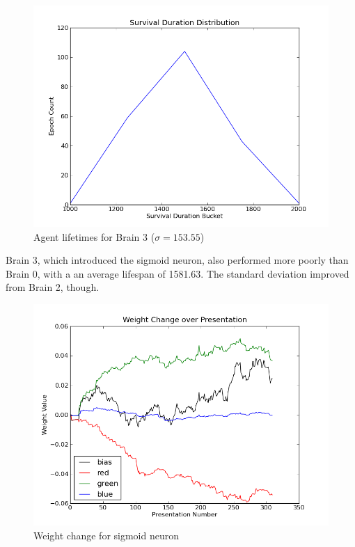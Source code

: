 \begin{figure}
\begin{center}
  \includegraphics[scale=.65]{plots/brain3hist.png}
  \caption{Agent lifetimes for Brain 3 ($\sigma = 153.55$)}
  \label{fig:brain3his}
\end{center}
\end{figure}

Brain 3, which introduced the sigmoid neuron, also performed more poorly
than Brain 0, with a an average lifespan of 1581.63. The standard deviation
improved from Brain 2, though.

\begin{figure}
\begin{center}
  \includegraphics[scale=.65]{plots/weights.png}
  \caption{Weight change for sigmoid neuron}
  \label{fig:brain3wghts}
\end{center}
\end{figure}

